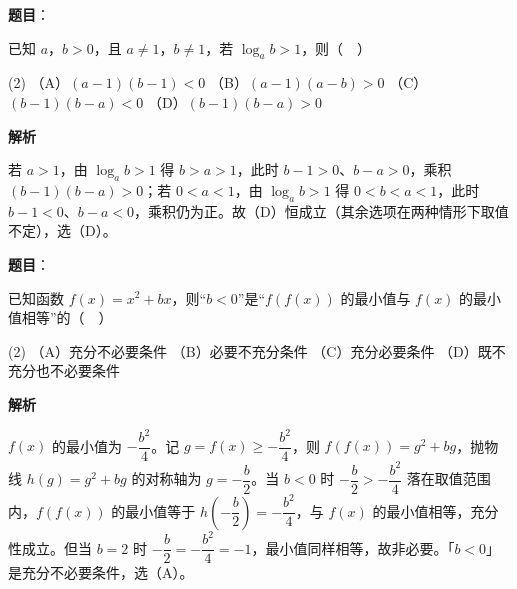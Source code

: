 \begin{answer}

\textbf{题目}：

已知 \(a\)，\(b>0\)，且 \(a\neq1\)，\(b\neq1\)，若 \(\log_a b>1\)，则（　）

\begin{gkopts}(2)
\task （A）\((a-1)(b-1)<0\)
\task （B）\((a-1)(a-b)>0\)
\task （C）\((b-1)(b-a)<0\)
\task （D）\((b-1)(b-a)>0\)
\end{gkopts}

\textbf{解析}

若 \(a>1\)，由 \(\log_a b>1\) 得 \(b>a>1\)，此时 \(b-1>0\)、\(b-a>0\)，乘积 \((b-1)(b-a)>0\)；若 \(0<a<1\)，由 \(\log_a b>1\) 得 \(0<b<a<1\)，此时 \(b-1<0\)、\(b-a<0\)，乘积仍为正。故（D）恒成立（其余选项在两种情形下取值不定），选（D）。


\end{answer}
\begin{answer}

\textbf{题目}：

已知函数 \(f(x)=x^{2}+bx\)，则“\(b<0\)”是“\(f(f(x))\) 的最小值与 \(f(x)\) 的最小值相等”的（　）

\begin{gkopts}(2)
\task （A）充分不必要条件
\task （B）必要不充分条件
\task （C）充分必要条件
\task （D）既不充分也不必要条件
\end{gkopts}

\textbf{解析}

\(f(x)\) 的最小值为 \(-\dfrac{b^{2}}{4}\)。记 \(g=f(x)\geqslant-\dfrac{b^{2}}{4}\)，则 \(f(f(x))=g^{2}+bg\)，抛物线 \(h(g)=g^{2}+bg\) 的对称轴为 \(g=-\dfrac{b}{2}\)。当 \(b<0\) 时 \(-\dfrac{b}{2}>-\dfrac{b^{2}}{4}\) 落在取值范围内，\(f(f(x))\) 的最小值等于 \(h\left(-\dfrac{b}{2}\right)=-\dfrac{b^{2}}{4}\)，与 \(f(x)\) 的最小值相等，充分性成立。但当 \(b=2\) 时 \(-\dfrac{b}{2}=-\dfrac{b^{2}}{4}=-1\)，最小值同样相等，故非必要。「\(b<0\)」是充分不必要条件，选（A）。


\end{answer}
